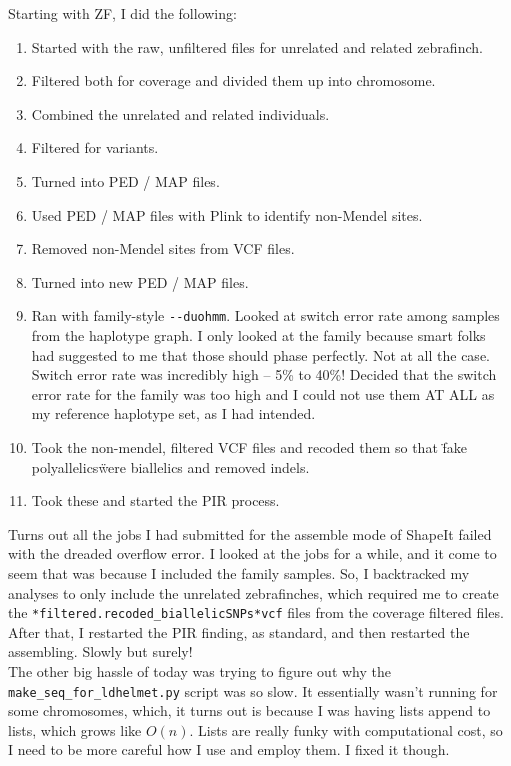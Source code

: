 \documentclass[idxtotoc,hyperref,openany,oneside]{labbook} %
\begin{document}
Starting with ZF, I did the following:
\begin{enumerate}
\item Started with the raw, unfiltered files for unrelated and related zebrafinch.
\item Filtered both for coverage and divided them up into chromosome.
\item Combined the unrelated and related individuals.
\item Filtered for variants.
\item Turned into PED / MAP files.
\item Used PED / MAP files with Plink to identify non-Mendel sites.
\item Removed non-Mendel sites from VCF files.
\item Turned into new PED / MAP files.
\item Ran with family-style \verb+--duohmm+. Looked at switch error rate among samples from the haplotype graph. I only looked at the family because smart folks had suggested to me that those should phase perfectly. Not at all the case. Switch error rate was incredibly high -- 5\% to 40\%! Decided that the switch error rate for the family was too high and I could not use them AT ALL as my reference haplotype set, as I had intended.
\item Took the non-mendel, filtered VCF files and recoded them so that \"fake polyallelics\" were biallelics and removed indels.
\item Took these and started the PIR process.
\end{enumerate}

Turns out all the jobs I had submitted for the assemble mode of ShapeIt failed with the dreaded overflow error. I looked at the jobs for a while, and it come to seem that was because I included the family samples. So, I backtracked my analyses to only include the unrelated zebrafinches, which required me to create the \verb+*filtered.recoded_biallelicSNPs*vcf+ files from the coverage filtered files. After that, I restarted the PIR finding, as standard, and then restarted the assembling. Slowly but surely! \\ 

The other big hassle of today was trying to figure out why the \verb+make_seq_for_ldhelmet.py+ script was so slow. It essentially wasn't running for some chromosomes, which, it turns out is because I was having lists append to lists, which grows like $O(n)$. Lists are really funky with computational cost, so I need to be more careful how I use and employ them. I fixed it though.
\end{document}
